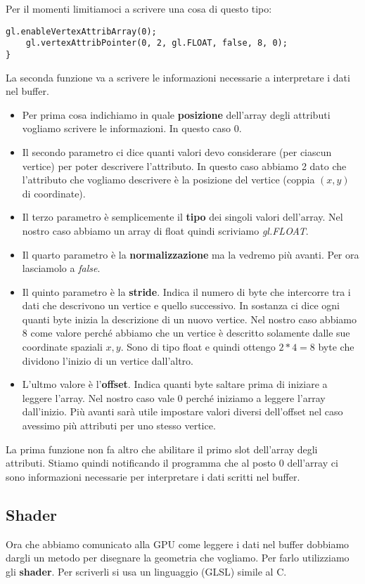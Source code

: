 Per il momenti limitiamoci a scrivere una cosa di questo tipo:
\begin{lstlisting}[style=js, firstnumber=10]
	gl.enableVertexAttribArray(0);
	gl.vertexAttribPointer(0, 2, gl.FLOAT, false, 8, 0);
}
\end{lstlisting}
La seconda funzione va a scrivere le informazioni necessarie a interpretare i dati nel
buffer.
\begin{itemize}
	\item Per prima cosa indichiamo in quale \textbf{posizione} dell'array degli attributi
	      vogliamo scrivere le informazioni. In questo caso 0.
	\item Il secondo parametro ci dice quanti valori devo considerare (per ciascun vertice)
	      per poter descrivere l'attributo. In questo caso abbiamo 2 dato che l'attributo
	      che vogliamo descrivere \`e la posizione del vertice (coppia $(x, y)$ di
	      coordinate).
	\item Il terzo parametro \`e semplicemente il \textbf{tipo} dei singoli valori dell'array.
	      Nel nostro caso abbiamo un array di float quindi scriviamo \emph{gl.FLOAT}.
	\item Il quarto parametro \`e la \textbf{normalizzazione} ma la vedremo pi\`u avanti.
	      Per ora lasciamolo a \emph{false}.
	\item Il quinto parametro \`e la \textbf{stride}. Indica il numero di byte che intercorre
	      tra i dati che descrivono un vertice e quello successivo. In sostanza ci dice ogni
	      quanti byte inizia la descrizione di un nuovo vertice. Nel nostro caso abbiamo 8
	      come valore perch\'e abbiamo che un vertice \`e descritto solamente dalle sue
	      coordinate spaziali $x, y$. Sono di tipo float e quindi ottengo $2 * 4 = 8$ byte
	      che dividono l'inizio di un vertice dall'altro.
	\item L'ultmo valore \`e l'\textbf{offset}. Indica quanti byte saltare prima di iniziare
	      a leggere l'array. Nel nostro caso vale 0 perch\'e iniziamo a leggere l'array
	      dall'inizio. Pi\`u avanti sar\`a utile impostare valori diversi dell'offset
	      nel caso avessimo pi\`u attributi per uno stesso vertice.
\end{itemize}
La prima funzione non fa altro che abilitare il primo slot dell'array degli attributi.
Stiamo quindi notificando il programma che al posto 0 dell'array ci sono informazioni
necessarie per interpretare i dati scritti nel buffer.

\subsection{Shader}
Ora che abbiamo comunicato alla GPU come leggere i dati nel buffer dobbiamo dargli un
metodo per disegnare la geometria che vogliamo. Per farlo utilizziamo gli \textbf{shader}.
Per scriverli si usa un linguaggio (GLSL) simile al C.

